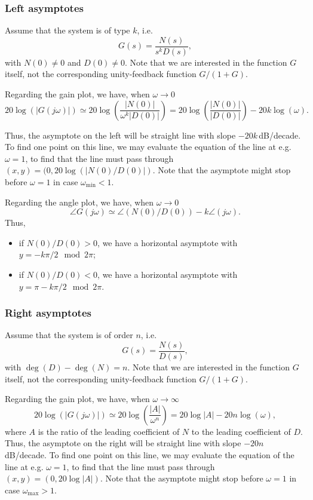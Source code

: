 \documentclass[a4paper,11pt]{report}
\theoremstyle{definition}
\begin{document}
\subsubsection{Left asymptotes}

Assume that the system is of type $k$, i.e.
\[
G(s) = \frac{N(s)}{s^kD(s)},
\]
with $N(0)\neq 0$ and $D(0)\neq 0$. Note that we are interested in the
function $G$ itself, not the corresponding unity-feedback function
$G/(1+G)$. 

Regarding the gain plot, we have, when $\omega\to 0$
\[
20\log(|G(j\omega)|) \simeq
20\log\left(\frac{|N(0)|}{\omega^k|D(0)|}\right)
= 20\log\left(\frac{|N(0)|}{|D(0)|}\right) - 20k\log(\omega).
\]

Thus, the asymptote on the left will be straight line with slope
$-20k$\,dB/decade. To find one point on this line, we may evaluate
the equation of the line at e.g. $\omega=1$, to find that the line
must pass through $(x,y)=(0,20\log(|N(0)/D(0)|)$. Note that the
asymptote might stop before $\omega=1$ in case $\omega_{\min} < 1$.

Regarding the angle plot, we have, when $\omega\to 0$
\[
\angle G(j\omega) \simeq \angle(N(0)/D(0)) - k\angle(j\omega).
\]
Thus, 
\begin{itemize}
\item if $N(0)/D(0)>0$, we have a horizontal asymptote with
$y=-k\pi/2 \mod 2\pi$;
\item  if $N(0)/D(0)<0$, we have a horizontal asymptote with
$y=\pi-k\pi/2\mod 2\pi$.
\end{itemize}

\subsubsection{Right asymptotes}

Assume that the system is of order $n$, i.e.
\[
G(s) = \frac{N(s)}{D(s)},
\]
with $\deg(D)-\deg(N)=n$. Note that we are interested in the
function $G$ itself, not the corresponding unity-feedback function
$G/(1+G)$. 

Regarding the gain plot, we have, when $\omega\to \infty$
\[
20\log(|G(j\omega)|) \simeq
20\log\left(\frac{|A|}{\omega^n}\right)
= 20\log |A| - 20n\log(\omega),
\]
where $A$ is the ratio of the leading coefficient of $N$ to the
leading coefficient of $D$. Thus, the asymptote on the right will be
straight line with slope $-20n$\,dB/decade. To find one point on this
line, we may evaluate the equation of the line at e.g. $\omega=1$, to
find that the line must pass through $(x,y)=(0,20\log |A|)$. Note that
the asymptote might stop before $\omega=1$ in case $\omega_{\max} >
1$.
\end{document}
